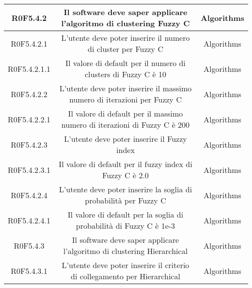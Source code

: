 \begin{center}
\begin{longtable}{|c|c|c|}
\hline
R0F5.4.2   & \parbox[t]{\larghezza}{Il software deve saper applicare l'algoritmo di clustering Fuzzy C}  & \parbox[t]{\dimFonti}{ Algorithms \\} \\
\hline
R0F5.4.2.1   & \parbox[t]{\larghezza}{L'utente deve poter inserire il numero di cluster per Fuzzy C}  & \parbox[t]{\dimFonti}{ Algorithms \\} \\
\hline
R0F5.4.2.1.1   & \parbox[t]{\larghezza}{Il valore di default per il numero di clusters di Fuzzy C\glossario{} è 10}  & \parbox[t]{\dimFonti}{ Algorithms \\} \\
\hline
R0F5.4.2.2   & \parbox[t]{\larghezza}{L'utente deve poter inserire il massimo numero di iterazioni per Fuzzy C}  & \parbox[t]{\dimFonti}{ Algorithms \\} \\
\hline
R0F5.4.2.2.1   & \parbox[t]{\larghezza}{Il valore di default per il massimo numero di iterazioni di Fuzzy C è 200}  & \parbox[t]{\dimFonti}{ Algorithms \\} \\
\hline
R0F5.4.2.3   & \parbox[t]{\larghezza}{L'utente deve poter inserire il Fuzzy index}  & \parbox[t]{\dimFonti}{ Algorithms \\} \\
\hline
R0F5.4.2.3.1   & \parbox[t]{\larghezza}{Il valore di default per il fuzzy index di Fuzzy C è 2.0}  & \parbox[t]{\dimFonti}{ Algorithms \\} \\
\hline
R0F5.4.2.4   & \parbox[t]{\larghezza}{L'utente deve poter inserire la soglia di probabilità per Fuzzy C\glossario{}}  & \parbox[t]{\dimFonti}{ Algorithms \\} \\
\hline
R0F5.4.2.4.1   & \parbox[t]{\larghezza}{Il valore di default per la soglia di probabilità di Fuzzy C\glossario{} è 1e-3}  & \parbox[t]{\dimFonti}{ Algorithms \\} \\
\hline
R0F5.4.3   & \parbox[t]{\larghezza}{Il software deve saper applicare l'algoritmo di clustering Hierarchical}  & \parbox[t]{\dimFonti}{ Algorithms \\} \\
\hline
R0F5.4.3.1   & \parbox[t]{\larghezza}{L'utente deve poter inserire il criterio di collegamento per Hierarchical}  & \parbox[t]{\dimFonti}{ Algorithms \\} \\

\end{longtable}
\end{center}
